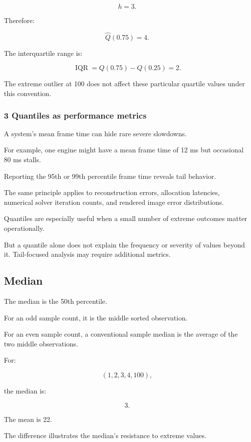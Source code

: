 \[
 h=3.
\]

Therefore:

\[
 \hat Q(0.75)=4.
\]

The interquartile range is:

\[
 \boxed{ \operatorname{IQR}=Q(0.75)-Q(0.25)=2 }.
\]

The extreme outlier at 100 does not affect these particular quartile values under this convention.

\subsubsection{3 Quantiles as performance metrics}\label{02-foundations-ii-ch030-quantiles-as-performance-metrics}

A system's mean frame time can hide rare severe slowdowns.

For example, one engine might have a mean frame time of 12 ms but occasional 80 ms stalls.

Reporting the 95th or 99th percentile frame time reveals tail behavior.

The same principle applies to reconstruction errors, allocation latencies, numerical solver iteration counts, and rendered image error distributions.

Quantiles are especially useful when a small number of extreme outcomes matter operationally.

But a quantile alone does not explain the frequency or severity of values beyond it. Tail-focused analysis may require additional metrics.

\subsection{Median}\label{02-foundations-ii-ch030-median}

The median is the 50th percentile.

For an odd sample count, it is the middle sorted observation.

For an even sample count, a conventional sample median is the average of the two middle observations.

For:

\[
 (1,2,3,4,100),
\]

the median is:

\[
 \boxed{3}.
\]

The mean is 22.

The difference illustrates the median's resistance to extreme values.

